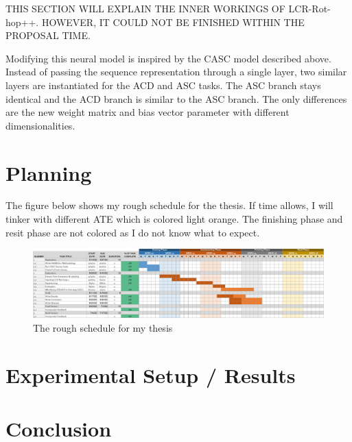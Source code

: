 \documentclass[american, oneside]{ecsgdp}
\begin{document}
THIS SECTION WILL EXPLAIN THE INNER WORKINGS OF LCR-Rot-hop++. HOWEVER, IT COULD NOT BE FINISHED WITHIN THE PROPOSAL TIME.


Modifying this neural model is inspired by the CASC model described above. Instead of passing the sequence representation through a single layer, two similar layers are instantiated for the ACD and ASC tasks. The ASC branch stays identical and the ACD branch is similar to the ASC branch. The only differences are the new weight matrix and bias vector parameter with different dimensionalities.


\chapter{Planning} \label{chap:planning}
The figure below shows my rough schedule for the thesis. If time allows, I will tinker with different ATE which is colored light orange. The finishing phase and resit phase are not colored as I do not know what to expect.

\begin{figure}[htbp]
    \centering
    \includegraphics[width=1.5\textwidth, angle=90]{planning_gantt.png}
    \caption{The rough schedule for my thesis}
    \label{fig:planning}
\end{figure}


\chapter{Experimental Setup / Results} \label{chap:results}

\chapter{Conclusion} \label{chap:conclusion}

\backmatter

\printbibliography

\appendix
\end{document}
